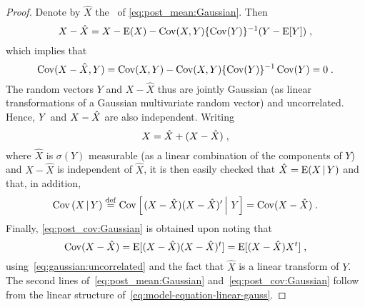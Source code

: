 \begin{proof}
Denote by $\hat{X}$ the \rhs\ of \eqref{eq:post_mean:Gaussian}. Then
\begin{equation*}
  X - \hat{X} = X- \operatorname{E}(X) - \operatorname{Cov}(X,Y)  \{ \operatorname{Cov}(Y) \}^{-1} ( Y - \operatorname{E}[Y])
  \; ,
\end{equation*}
which implies that
\begin{equation}
  \label{eq:gaussian:uncorrelated}
 \operatorname{Cov}(X-\hat{X},Y)= \operatorname{Cov}(X,Y) - \operatorname{Cov}(X,Y) \{ \operatorname{Cov}(Y) \}^{-1} \operatorname{Cov}(Y) = 0
 \;.
\end{equation}
The random vectors $Y$ and $X-\hat{X}$ thus are jointly Gaussian (as linear
transformations of a Gaussian multivariate random vector) and uncorrelated.
Hence, $Y$ and $X - \hat{X}$ are also independent. Writing
\[
  X = \hat{X} + (X-\hat{X}) \; ,
\]
where $\hat{X}$ is $\sigma(Y)$ measurable (as a linear combination of
the components of $Y$) and $X-\hat{X}$ is independent of $\hat{X}$, it is then
easily checked  that $\hat{X} =
\operatorname{E}(X\,|\, Y)$ and that, in addition,
\[
  \operatorname{Cov}\left(X \,|\, Y\right) \stackrel{\mathrm{def}}{=} \operatorname{Cov}\left[\left.(X-\hat{X})(X-\hat{X})'
    \,\right|\,Y\right] = \operatorname{Cov}(X -\hat{X}) \; .
\]
Finally, \eqref{eq:post_cov:Gaussian} is obtained upon noting that
\begin{equation*}
\operatorname{Cov}(X -\hat{X}) = \operatorname{E}[ (X - \hat{X} ) (X - \hat{X})^t] = \operatorname{E}[ (X - \hat{X}) X^t] \; ,
\end{equation*}
using~\eqref{eq:gaussian:uncorrelated} and the fact that $\hat{X}$ is a linear
transform of $Y$. The second lines of~\eqref{eq:post_mean:Gaussian}
and~\eqref{eq:post_cov:Gaussian} follow from the
linear structure of~\eqref{eq:model-equation-linear-gauss}.
\end{proof}

